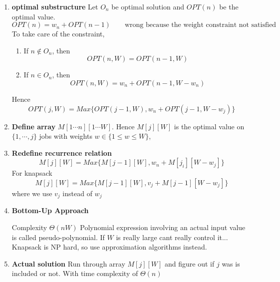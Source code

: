 \documentclass[11pt]{article}
\begin{document}
\begin{enumerate}
  \item \textbf{optimal substructure} Let $O_n$ be optimal solution and $OPT(n)$ be the optimal value.
  \[
    OPT(n) = w_n + OPT(n-1) \quad \quad \text{wrong because the weight constraint not satisfied}
  \]
  To take care of the constraint,
  \begin{enumerate}
    \item If $n\not\in O_n$, then
    \[
      OPT(n, W) = OPT(n-1, W)
    \]
    \item If $n\in O_n$, then
    \[
      OPT(n, W) = w_n + OPT(n-1, W-w_n)
    \]
  \end{enumerate}
  Hence
  \[
    OPT(j, W) = Max\{ OPT(j-1, W), w_n + OPT(j-1, W-w_j) \}
  \]
  \item \textbf{Define array} $M[1\cdots n][1\cdots W]$. Hence $M[j][W]$ is the optimal value on $\{ 1, \cdots, j\}$ jobs with weights $w \in \{ 1\leq w\leq W\}$,
  \item \textbf{Redefine recurrence relation}
  \[
    M[j][W] =  Max\{ M[j-1][W], w_n + M[j_i][W-w_j]\}
  \]
  For knapsack
  \[
    M[j][W] = Max\{ M[j-1][W], v_j + M[j-1][W-w_j]\}
  \]
  where we use $v_j$ instead of $w_j$
  \item \textbf{Bottom-Up Approach}

  \begin{algorithm}[H]
  \end{algorithm}

  Complexity $\Theta(nW)$ Polynomial expression involving an actual input value is called pseudo-polynomial. If $W$ is really large cant really control it... Knapsack is NP hard, so use approximation algorithms instead.

  \item \textbf{Actual solution} Run through array $M[j][W]$ and figure out if $j$ was is included or not. With time complexity of $\Theta(n)$
\end{enumerate}
\end{document}

